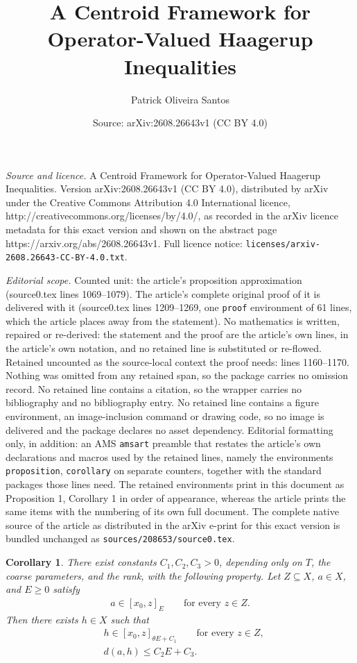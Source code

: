 \documentclass[10pt,a4paper]{amsart}
\title{A Centroid Framework for Operator-Valued Haagerup Inequalities}
\author{Patrick Oliveira Santos}
\date{Source: arXiv:2608.26643v1 (CC BY 4.0)}
\newtheorem{corollary}{Corollary}
\begin{document}
\maketitle

\noindent\emph{Source and licence.} A Centroid Framework for Operator-Valued Haagerup Inequalities. Version arXiv:2608.26643v1 (CC BY 4.0), distributed by arXiv under the Creative Commons Attribution 4.0 International licence, http://creativecommons.org/licenses/by/4.0/, as recorded in the arXiv licence metadata for this exact version and shown on the abstract page https://arxiv.org/abs/2608.26643v1. Full licence notice: \texttt{licenses/arxiv-2608.26643-CC-BY-4.0.txt}.\par\smallskip

\noindent\textit{Editorial scope.} Counted unit: the article's proposition approximation (source0.tex lines 1069--1079). The article's complete original proof of it is delivered with it (source0.tex lines 1209--1269, one \texttt{proof} environment of 61 lines, which the article places away from the statement). No mathematics is written, repaired or re-derived: the statement and the proof are the article's own lines, in the article's own notation, and no retained line is substituted or re-flowed.  Retained uncounted as the source-local context the proof needs: lines 1160--1170.  Nothing was omitted from any retained span, so the package carries no omission record.  No retained line contains a citation, so the wrapper carries no bibliography and no bibliography entry.  No retained line contains a figure environment, an image-inclusion command or drawing code, so no image is delivered and the package declares no asset dependency.  Editorial formatting only, in addition: an AMS \texttt{amsart} preamble that restates the article's own declarations and macros used by the retained lines, namely the environments \texttt{proposition}, \texttt{corollary} on separate counters, together with the standard packages those lines need.  The retained environments print in this document as Proposition 1, Corollary 1 in order of appearance, whereas the article prints the same items with the numbering of its own full document.  The complete native source of the article as distributed in the arXiv e-print for this exact version is bundled unchanged as \texttt{sources/208653/source0.tex}.
\begin{corollary}\label{corollary: iterative procedure}
    There exist constants $C_1,C_2,C_3>0$, depending only on $T$, the coarse parameters, and the rank, with the following property. Let $Z\subseteq X$, $a\in X$, and $E\ge 0$ satisfy
    \begin{align*}
        a\in [x_0,z]_E\qquad\text{for every }z\in Z.
    \end{align*}
    Then there exists $h\in X$ such that
    \begin{align*}
        &h\in [x_0,z]_{\theta E+C_1}\qquad\text{for every }z\in Z,\\
        &d(a,h)\le C_2E+C_3.
    \end{align*}
\end{corollary}
\end{document}
